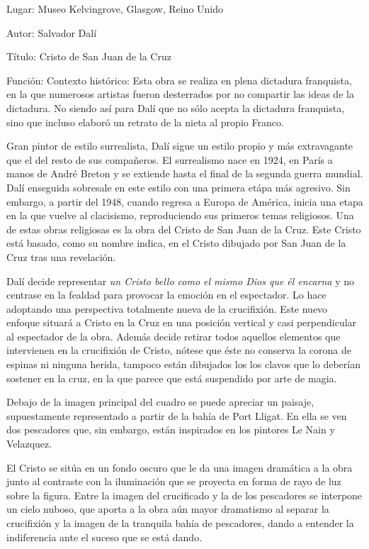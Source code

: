 Lugar: Museo Kelvingrove, Glasgow, Reino Unido

Autor: Salvador Dalí

Título: Cristo de San Juan de la Cruz


Función: Contexto histórico: Esta obra se realiza en plena dictadura franquista, en la que numerosos artistas fueron desterrados por no compartir las ideas de la dictadura. No siendo así para Dalí que no sólo acepta la dictadura franquista, sino que incluso elaboró un retrato de la nieta al propio Franco.

Gran pintor de estilo surrealista, Dalí sigue un estilo propio y más extravagante que el del resto de sus compañeros. El surrealismo nace en 1924, en París a manos de André Breton y se extiende hasta el final de la segunda guerra mundial. Dalí enseguida sobresale en este estilo con una primera etápa más agresivo. Sin embargo, a partir del 1948, cuando regresa a Europa de América, inicia una etapa en la que vuelve al clacisismo, reproduciendo sus primeros temas religiosos. Una de estas obras religiosas es la obra del Cristo de San Juan de la Cruz. Este Cristo está basado, como su nombre indica, en el Cristo dibujado por San Juan de la Cruz tras una revelación.

Dalí decide representar \textit{un Cristo bello como el mismo Dios que él encarna} y no centrase en la fealdad para provocar la emoción en el espectador. Lo hace adoptando una perspectiva totalmente nueva de la crucifixión. Este nuevo enfoque situará a Cristo en la Cruz en una posición vertical y casi perpendicular al espectador de la obra. Además decide retirar todos aquellos elementos que intervienen en la crucifixión de Cristo, nótese que éste no conserva la corona de espinas ni ninguna herida, tampoco están dibujados los los clavos que lo deberían sostener en la cruz, en la que parece que está suspendido por arte de magia.

Debajo de la imagen principal del cuadro se puede apreciar un paisaje, supuestamente representado a partir de la bahía de Port Lligat. En ella se ven dos pescadores que, sin embargo, están inspirados en los pintores Le Nain y Velazquez.

El Cristo se sitúa en un fondo oscuro que le da una imagen dramática a la obra junto al contraste con la iluminación que se proyecta en forma de rayo de luz sobre la figura. Entre la imagen del crucificado y la de los pescadores se interpone un cielo nuboso, que aporta a la obra aún mayor dramatismo al separar la crucifixión y la imagen de la tranquila bahía de pescadores, dando a entender la indiferencia ante el suceso que se está dando.


